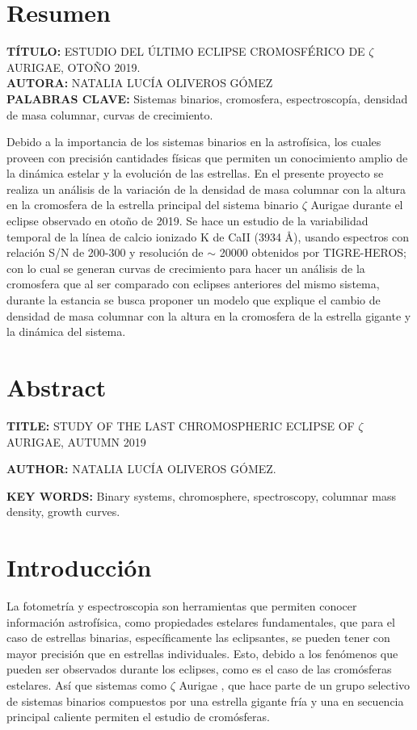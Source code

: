\documentclass[12pt,oneside,openany,letter]{book}
\begin{document}
\chapter*{Resumen}
{\footnotesize \textbf{T\'ITULO:} ESTUDIO DEL ÚLTIMO ECLIPSE CROMOSFÉRICO DE $\zeta$ AURIGAE, OTOÑO 2019.\\
\textbf{AUTORA:} NATALIA LUCÍA OLIVEROS GÓMEZ\\
\textbf{PALABRAS CLAVE:} Sistemas binarios, cromosfera, espectroscopía, densidad de masa columnar, curvas de crecimiento.
\vspace{2mm}

Debido a la importancia de los sistemas binarios en la astrofísica, los cuales proveen con precisión cantidades físicas que permiten un conocimiento amplio de la dinámica estelar y la evolución de las estrellas. En el presente proyecto se realiza un análisis de la variación de la densidad de masa columnar con la altura en la cromosfera de la estrella principal del sistema binario $\zeta$ Aurigae durante el eclipse observado en otoño de 2019. Se hace un estudio de la variabilidad temporal de la línea de calcio ionizado K de CaII (3934 \r{A}), usando espectros con relación S/N de 200-300 y resolución de $\sim$ 20000 obtenidos por TIGRE-HEROS; con lo cual se generan curvas de crecimiento para hacer un análisis de la cromosfera que al ser comparado con eclipses anteriores del mismo sistema, durante la estancia se busca proponer un modelo que explique el cambio de densidad de masa columnar con la altura en la cromosfera de la estrella gigante y la dinámica del sistema.}

\chapter*{Abstract}

{\footnotesize \textbf{TITLE:} STUDY OF THE LAST CHROMOSPHERIC ECLIPSE OF $\zeta$ AURIGAE, AUTUMN 2019

\textbf{AUTHOR:} NATALIA LUCÍA OLIVEROS GÓMEZ.

\textbf{KEY WORDS:} Binary systems, chromosphere, spectroscopy, columnar mass density, growth curves.
}



\chapter{Introducción}\label{cap1}
La fotometría y espectroscopia son herramientas que permiten conocer información astrofísica, como propiedades estelares fundamentales, que para el caso de estrellas binarias, específicamente las eclipsantes, se pueden tener con mayor precisión que en estrellas individuales. Esto, debido a los fenómenos que pueden ser observados durante los eclipses, como es el caso de las cromósferas estelares. Así que sistemas como $\zeta$ Aurigae \citep{shenavrin2011vizier}, que hace parte de un grupo selectivo de sistemas binarios compuestos por una estrella gigante fría y una en secuencia principal caliente permiten el estudio de cromósferas. 
\vspace{2mm}
\end{document}

